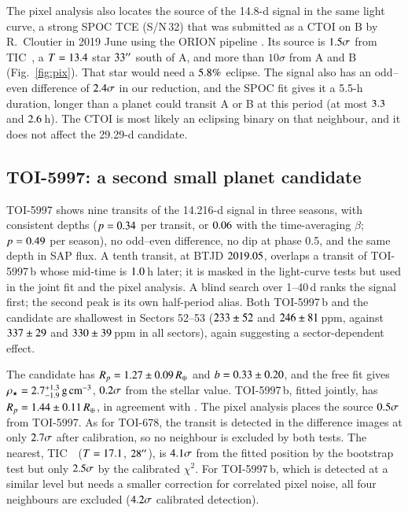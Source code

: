 \documentclass[twocolumn,numberedappendix,appendixfloats]{openjournal}
\newcommand{\rearth}{R_{\oplus}}
\newcommand{\gcc}{\,\mathrm{g\,cm^{-3}}}
\begin{document}
The pixel analysis also locates the source of the 14.8-d signal in the same
light curve, a strong SPOC TCE (S/N\,32) that was submitted as a CTOI on B by
R.~Cloutier in 2019 June using the ORION pipeline \citep{cloutier2019}. Its
source is $1.5\sigma$ from TIC~\fsrcTIC, a $T = 13.4$ star
$33''$ south of A, and more than $10\sigma$ from A and B
(Fig.~\ref{fig:pix}). That star would need a $5.8\%$ eclipse. The signal
also has an odd--even difference of $2.4\sigma$ in our reduction, and the
SPOC fit gives it a 5.5-h duration, longer than a planet could transit A or B
at this period (at most $3.3$ and $2.6$\,h). The CTOI is most
likely an eclipsing binary on that neighbour, and it does not affect the
29.29-d candidate.

\subsection{TOI-5997: a second small planet candidate}
\label{sec:toi5997}

TOI-5997 shows nine transits of the 14.216-d signal in three seasons, with
consistent depths ($p = 0.34$ per transit, or $0.06$ with the
time-averaging $\beta$; $p = 0.49$ per season), no odd--even difference, no
dip at phase 0.5, and the same depth in SAP flux. A tenth transit, at BTJD
$2019.05$, overlaps a transit of TOI-5997\,b whose mid-time is $1.0$\,h
later; it is masked in the light-curve tests but used in the joint fit and the
pixel analysis. A blind search
over 1--40\,d ranks the signal first; the second peak is its own half-period
alias. Both TOI-5997\,b and the candidate are shallowest in Sectors
52--53 ($233 \pm 52$ and $246 \pm 81$\,ppm, against $337 \pm 29$ and
$330 \pm 39$\,ppm in all sectors), again suggesting a sector-dependent
effect.

The candidate has $R_p = \RpTf\,\rearth$ and $b = 0.33 \pm 0.20$, and the free fit gives
$\rho_\star = \rhofreeTf\gcc$, $0.2\sigma$ from the stellar value. TOI-5997\,b, fitted
jointly, has $R_p = \RpTfb\,\rearth$, in agreement with \citet{collier2026}.
The pixel analysis places the source $0.5\sigma$ from TOI-5997. As for
TOI-678, the transit is detected in the difference images at only
$2.7\sigma$ after calibration, so no neighbour is excluded by both tests.
The nearest, TIC~\nbTICTf\ ($T = 17.1$, $28''$), is $4.1\sigma$
from the fitted position by the bootstrap test but only $2.5\sigma$ by
the calibrated $\chi^2$. For TOI-5997\,b, which is detected at
a similar level but needs a smaller correction for correlated pixel noise, all
four neighbours are excluded ($4.2\sigma$ calibrated detection).
\end{document}

